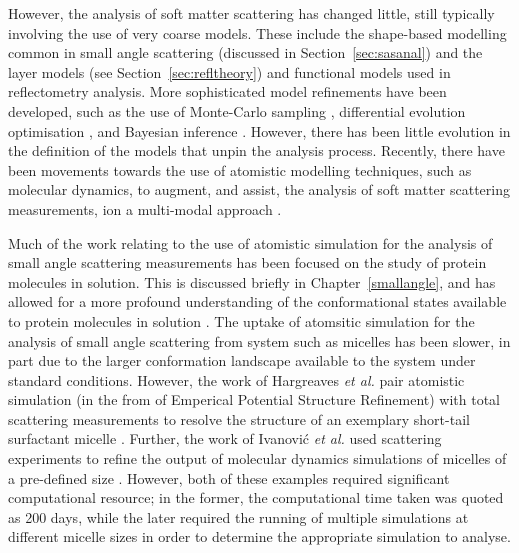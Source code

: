 However, the analysis of soft matter scattering has changed little, still typically involving the use of very coarse models.
These include the shape-based modelling common in small angle scattering (discussed in Section~\ref{sec:sasanal}) \cite{hassan_small_2003} and the layer models (see Section~\ref{sec:refltheory}) \cite{campbell_structure_2018} and functional models \cite{lu_analysis_1996} used in reflectometry analysis.
More sophisticated model refinements have been developed, such as the use of Monte-Carlo sampling \cite{pedersen_monte_2002}, differential evolution optimisation \cite{wormington_characterization_1999}, and Bayesian inference \cite{nelson_refnx_2019}.
However, there has been little evolution in the definition of the models that unpin the analysis process.
Recently, there have been movements towards the use of atomistic modelling techniques, such as molecular dynamics, to augment, and assist, the analysis of soft matter scattering measurements, ion a multi-modal approach \cite{scoppola_combining_2018}.

Much of the work relating to the use of atomistic simulation for the analysis of small angle scattering measurements has been focused on the study of protein molecules in solution.
This is discussed briefly in Chapter~\ref{smallangle}, and has allowed for a more profound understanding of the conformational states available to protein molecules in solution \cite{bowerman_determining_2017}.
The uptake of atomsitic simulation for the analysis of small angle scattering from system such as micelles has been slower, in part due to the larger conformation landscape available to the system under standard conditions.
However, the work of Hargreaves \emph{et al.} pair atomistic simulation (in the from of Emperical Potential Structure Refinement) with total scattering measurements to resolve the structure of an exemplary short-tail surfactant micelle \cite{hargreaves_atomistic_2011}.
Further, the work of Ivanovi\'{c} \emph{et al.} used scattering experiments to refine the output of molecular dynamics simulations of micelles of a pre-defined size \cite{ivanovic_temperature-dependent_2018}.
However, both of these examples required significant computational resource; in the former, the computational time taken was quoted as 200 days, while the later required the running of multiple simulations at different micelle sizes in order to determine the appropriate simulation to analyse.

